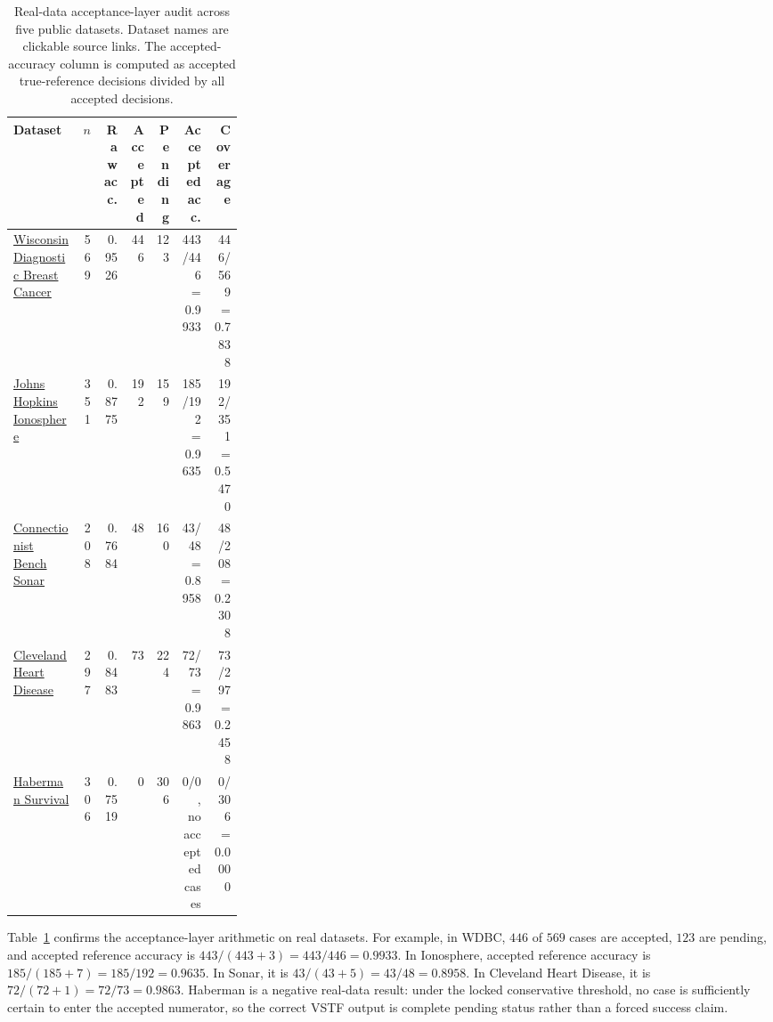 \documentclass[11pt,a4paper]{article}
\newcommand{\1}{\mathbf{1}}
\begin{document}
\begin{table}[h]
\centering
\caption{Real-data acceptance-layer audit across five public datasets. Dataset names are clickable source links. The accepted-accuracy column is computed as accepted true-reference decisions divided by all accepted decisions.}
\label{tab:real-static-datasets}
\scriptsize
\begin{adjustbox}{max width=\linewidth}
\begin{tabular}{p{0.30\linewidth}rrrrrr}
\toprule
Dataset & $n$ & Raw acc. & Accepted & Pending & Accepted acc. & Coverage \\
\midrule
\href{https://archive.ics.uci.edu/ml/machine-learning-databases/breast-cancer-wisconsin/wdbc.data}{Wisconsin Diagnostic Breast Cancer} & 569 & 0.9526 & 446 & 123 & 443/446 = 0.9933 & 446/569 = 0.7838 \\
\href{https://archive.ics.uci.edu/ml/machine-learning-databases/ionosphere/ionosphere.data}{Johns Hopkins Ionosphere} & 351 & 0.8775 & 192 & 159 & 185/192 = 0.9635 & 192/351 = 0.5470 \\
\href{https://archive.ics.uci.edu/ml/machine-learning-databases/undocumented/connectionist-bench/sonar/sonar.all-data}{Connectionist Bench Sonar} & 208 & 0.7684 & 48 & 160 & 43/48 = 0.8958 & 48/208 = 0.2308 \\
\href{https://archive.ics.uci.edu/ml/machine-learning-databases/heart-disease/processed.cleveland.data}{Cleveland Heart Disease} & 297 & 0.8483 & 73 & 224 & 72/73 = 0.9863 & 73/297 = 0.2458 \\
\href{https://archive.ics.uci.edu/ml/machine-learning-databases/haberman/haberman.data}{Haberman Survival} & 306 & 0.7519 & 0 & 306 & 0/0, no accepted cases & 0/306 = 0.0000 \\
\bottomrule
\end{tabular}
\end{adjustbox}
\end{table}

Table~\ref{tab:real-static-datasets} confirms the acceptance-layer arithmetic on real datasets. For example, in WDBC, $446$ of $569$ cases are accepted, $123$ are pending, and accepted reference accuracy is $443/(443+3)=443/446=0.9933$. In Ionosphere, accepted reference accuracy is $185/(185+7)=185/192=0.9635$. In Sonar, it is $43/(43+5)=43/48=0.8958$. In Cleveland Heart Disease, it is $72/(72+1)=72/73=0.9863$. Haberman is a negative real-data result: under the locked conservative threshold, no case is sufficiently certain to enter the accepted numerator, so the correct VSTF output is complete pending status rather than a forced success claim.
\end{document}

